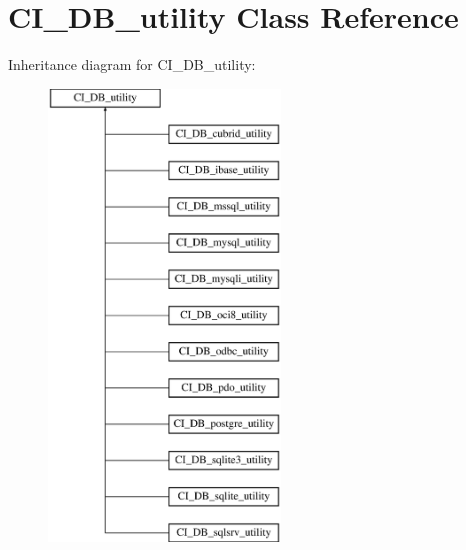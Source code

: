\hypertarget{class_c_i___d_b__utility}{}\section{C\+I\+\_\+\+D\+B\+\_\+utility Class Reference}
\label{class_c_i___d_b__utility}
Inheritance diagram for C\+I\+\_\+\+D\+B\+\_\+utility\+:\begin{figure}[H]
\begin{center}
\leavevmode
\includegraphics[height=12.000000cm]{class_c_i___d_b__utility}
\end{center}
\end{figure}
